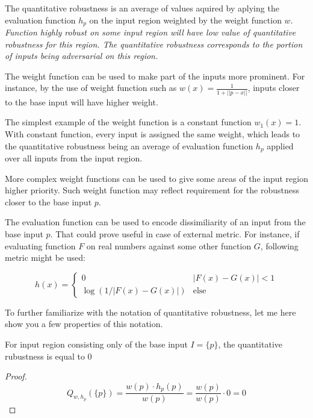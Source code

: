 The quantitative robustness is an average of values aquired by
aplying the evaluation function $h_p$ on the input region
weighted by the weight function $w$. \textit{Function highly robust on some
input region will have low value of quantitative robustness for this
region. The quantitative robustness corresponds to the portion of
inputs being adversarial on this region.}

The weight function can be used to make part of the inputs more prominent.
For instance, by the use of weight function such as $w(x) = \frac{1}{1+||p-x||}$,
inputs closer to the base input will have higher weight.


The simplest example of the weight function is a constant function $w_1(x) = 1$.
With constant function, every input is assigned the same weight,
which leads to the quantitative robustness being an average
of evaluation function $h_p$ applied over all inputs from the input region.

More complex weight functions can be used to give some areas of the input region
higher priority. Such weight function may reflect requirement for the robustness
closer to the base input $p$.

The evaluation function can be used to encode dissimiliarity of an input
from the base input $p$. That could prove useful in case of external metric.
For instance, if evaluating function $F$ on real numbers against some
other function $G$, following metric might be used:

\[h(x) = \begin{cases}
    0 & |F(x) - G(x)| < 1\\
    \log (1/|F(x)-G(x)|) & \text{else}
\end{cases}\]

To further familiarize with the notation of quantitative robustness,
let me here show you a few properties of this notation.

\begin{lemma}{For input region consisting only of the base input $I=\{p\}$,
    the quantitative rubustness is equal to 0}
    \begin{proof}
        \begin{equation*}
            Q_{w, h_p}(\{p\}) = \frac{w(p)\cdot h_p(p)}{w(p)} = \frac{w(p)}{w(p)}\cdot 0 = 0
        \end{equation*}
    \end{proof}
\end{lemma}

